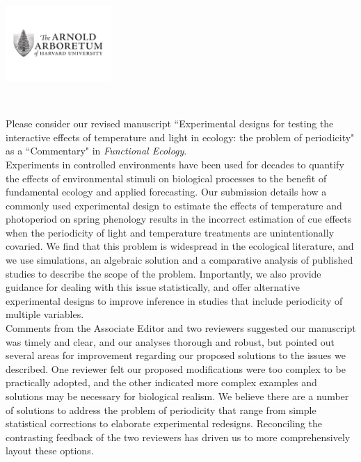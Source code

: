 \documentclass[11 pt]{article}
\begin{document}

\def\labelitemi{--}
\parindent=24pt
\noindent\includegraphics[width=0.3\textwidth]{AA_logo.jpg}

\\
\vspace{1.5ex}

\noindent Please consider our revised manuscript ``Experimental designs for testing the interactive effects of temperature and light in ecology: the problem of periodicity" as a ``Commentary" in \textit{Functional Ecology}.\\

\noindent Experiments in controlled environments have been used for decades to quantify the effects of environmental stimuli on biological processes to the benefit of fundamental ecology and applied forecasting. %
Our submission details how a commonly used experimental design to estimate the effects of temperature and photoperiod on spring phenology results in the incorrect estimation of cue effects when the periodicity of light and temperature treatments are unintentionally covaried. We find that this problem is widespread in the ecological literature, and we use simulations, an algebraic solution and a comparative analysis of published studies to describe the scope of the problem. Importantly, we also provide guidance for dealing with this issue statistically, and offer alternative experimental designs to improve inference in studies that include periodicity of multiple variables.\\

\noindent Comments from the Associate Editor and two reviewers suggested our manuscript was timely and clear, and our analyses thorough and robust, but pointed out several areas for improvement regarding our proposed solutions to the issues we described.
One reviewer felt our proposed modifications were too complex to be practically adopted, and the other indicated more complex examples and solutions may be necessary for biological realism. %
We believe there are a number of solutions to address the problem of periodicity that range from simple statistical corrections to elaborate experimental redesigns. Reconciling the contrasting feedback of the two reviewers has driven us to more comprehensively layout these options.\\%
\end{document}
